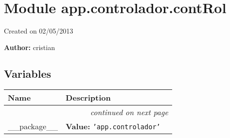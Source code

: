 %
%
%


\section{Module app.controlador.contRol}

    \label{app:controlador:contRol}
Created on 02/05/2013

\textbf{Author:} cristian





  \subsection{Variables}

    \vspace{-1cm}
\hspace{\varindent}\begin{longtable}{|p{\varnamewidth}|p{\vardescrwidth}|l}
\cline{1-2}
\cline{1-2} \centering \textbf{Name} & \centering \textbf{Description}& \\
\cline{1-2}
\endhead\cline{1-2}\multicolumn{3}{r}{\small\textit{continued on next page}}\\\endfoot\cline{1-2}
\endlastfoot\raggedright \_\-\_\-p\-a\-c\-k\-a\-g\-e\-\_\-\_\- & \raggedright \textbf{Value:} 
{\tt \texttt{'}\texttt{app.controlador}\texttt{'}}&\\
\cline{1-2}
\end{longtable}



